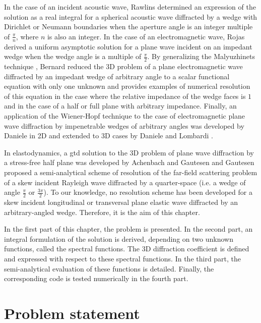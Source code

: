In the case of an incident acoustic wave, Rawlins \cite{Rawlins} determined an expression of the solution as a real integral for a spherical acoustic wave diffracted by a wedge with Dirichlet or Neumann boundaries when the aperture angle is an integer multiple of $\frac{\pi}{n}$, where $n$ is also an integer. In the case of an electromagnetic wave, Rojas \cite{Rojas} derived a uniform asymptotic solution for a plane wave incident on an impedant wedge when the wedge angle is a multiple of $\frac{\pi}{2}$. By generalizing the Malyuzhinets technique \cite{SMtechnique}, Bernard \cite{Bernard} reduced the 3D problem of a plane electromagnetic wave diffracted by an impedant wedge of arbitrary angle to a scalar functional equation with only one unknown and provides examples of numerical resolution of this equation in the case where the relative impedance of the wedge faces is $1$ and in the case of a half or full plane with arbitrary impedance. Finally, an application of the Wiener-Hopf technique to the case of electromagnetic plane wave diffraction by impenetrable wedges of arbitrary angles was developed by Daniele in 2D \cite{Daniele} and extended to 3D cases by Daniele and Lombardi \cite{DanieleLombardi}.

In elastodynamics, a \acrshort{gtd} solution to the 3D problem of plane wave diffraction by a stress-free half plane was developed by Achenbach and Gautesen \cite{Achenbach,AchenbachGautesen,GautesenNote} and Gautesen \cite{GautesenRayleigh4,GautesenRayleigh3} proposed a semi-analytical scheme of resolution of the far-field scattering problem of a skew incident Rayleigh wave diffracted by a quarter-space (i.e. a wedge of angle $\frac{\pi}{2}$ or $\frac{3\pi}{2}$). To our knowledge, no resolution scheme has been developed for a skew incident longitudinal or transversal plane elastic wave diffracted by an arbitrary-angled wedge. Therefore, it is the aim of this chapter.

In the first part of this chapter, the problem is presented. In the second part, an integral formulation of the solution is derived, depending on two unknown functions, called the spectral functions. The 3D diffraction coefficient is defined and expressed with respect to these spectral functions. In the third part, the semi-analytical evaluation of these functions is detailed. Finally, the corresponding code is tested numerically in the fourth part.
\section{Problem statement}

